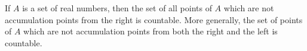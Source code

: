 If $A$ is a set of real numbers, then the set of all points of $A$ which are not accumulation points from the right is countable. More generally, the set of points of $A$ which are not accumulation points from both the right and the left is countable.
